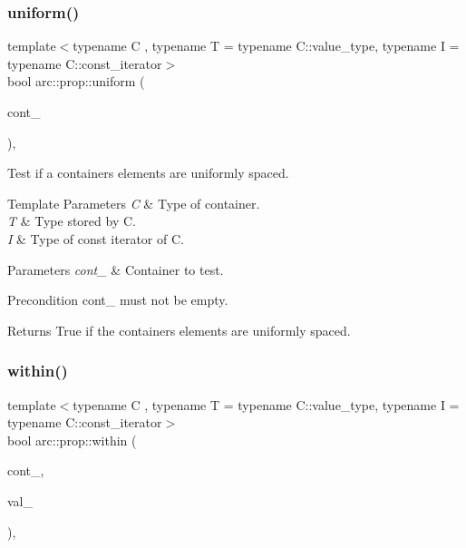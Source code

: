 \subsubsection{\texorpdfstring{uniform()}{uniform()}}
{\footnotesize\ttfamily template$<$typename C , typename T  = typename C\+::value\+\_\+type, typename I  = typename C\+::const\+\_\+iterator$>$ \\
bool arc\+::prop\+::uniform (\begin{DoxyParamCaption}\item[{const C \&}]{cont\+\_\+ }\end{DoxyParamCaption})\hspace{0.3cm}{\ttfamily [inline]}, {\ttfamily [noexcept]}}

Test if a container\textquotesingle{}s elements are uniformly spaced.


\begin{DoxyTemplParams}{Template Parameters}
{\em C} & Type of container. \\
\hline
{\em T} & Type stored by C. \\
\hline
{\em I} & Type of const iterator of C.\\
\hline
\end{DoxyTemplParams}

\begin{DoxyParams}{Parameters}
{\em cont\+\_\+} & Container to test.\\
\hline
\end{DoxyParams}
\begin{DoxyPrecond}{Precondition}
cont\+\_\+ must not be empty.
\end{DoxyPrecond}
\begin{DoxyReturn}{Returns}
True if the container\textquotesingle{}s elements are uniformly spaced. 
\end{DoxyReturn}
\mbox{\label{namespacearc_1_1prop_a160eaff41b7223c20c03ca76ee4e1fb9}} 
\subsubsection{\texorpdfstring{within()}{within()}}
{\footnotesize\ttfamily template$<$typename C , typename T  = typename C\+::value\+\_\+type, typename I  = typename C\+::const\+\_\+iterator$>$ \\
bool arc\+::prop\+::within (\begin{DoxyParamCaption}\item[{const C \&}]{cont\+\_\+,  }\item[{const T \&}]{val\+\_\+ }\end{DoxyParamCaption})\hspace{0.3cm}{\ttfamily [inline]}, {\ttfamily [noexcept]}}

